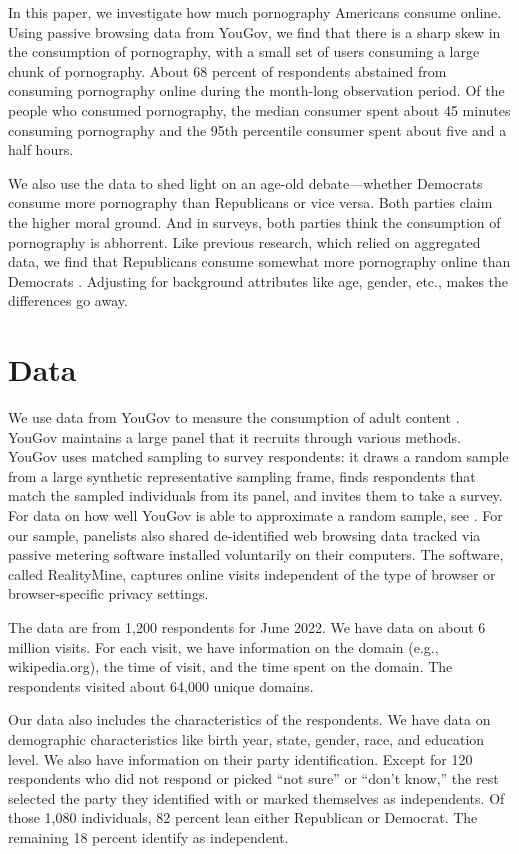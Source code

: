 \documentclass[12pt, letterpaper]{article}
\begin{document}
In this paper, we investigate how much pornography Americans consume online. Using passive browsing data from YouGov, we find that there is a sharp skew in the consumption of pornography, with a small set of users consuming a large chunk of pornography. About 68 percent of respondents abstained from consuming pornography online during the month-long observation period. Of the people who consumed pornography, the median consumer spent about 45 minutes consuming pornography and the 95th percentile consumer spent about five and a half hours. 

We also use the data to shed light on an age-old debate---whether Democrats consume more pornography than Republicans or vice versa. Both parties claim the higher moral ground. And in surveys, both parties think the consumption of pornography is abhorrent. Like previous research, which relied on aggregated data, we find that Republicans consume somewhat more pornography online than Democrats \citep{macinnis2015american, edelman2009markets}. Adjusting for background attributes like age, gender, etc., makes the differences go away.

\section*{Data}\label{sec:data}
We use data from YouGov to measure the consumption of adult content \citep{data-dataverse}. YouGov maintains a large panel that it recruits through various methods. YouGov uses matched sampling to survey respondents: it draws a random sample from a large synthetic representative sampling frame, finds respondents that match the sampled individuals from its panel, and invites them to take a survey. For data on how well YouGov is able to approximate a random sample, see \citet{rivers2009}. For our sample, panelists also shared de-identified web browsing data tracked via passive metering software installed voluntarily on their computers. The software, called RealityMine, captures online visits independent of the type of browser or browser-specific privacy settings.

The data are from 1,200 respondents for June 2022. We have data on about 6 million visits. For each visit, we have information on the domain (e.g., wikipedia.org), the time of visit, and the time spent on the domain. The respondents visited about 64,000 unique domains. 

Our data also includes the characteristics of the respondents. We have data on demographic characteristics like birth year, state, gender, race, and education level. We also have information on their party identification. Except for 120 respondents who did not respond or picked ``not sure'' or ``don't know,'' the rest selected the party they identified with or marked themselves as independents. Of those 1,080 individuals, 82 percent lean either Republican or Democrat. The remaining 18 percent identify as independent.
\end{document}

